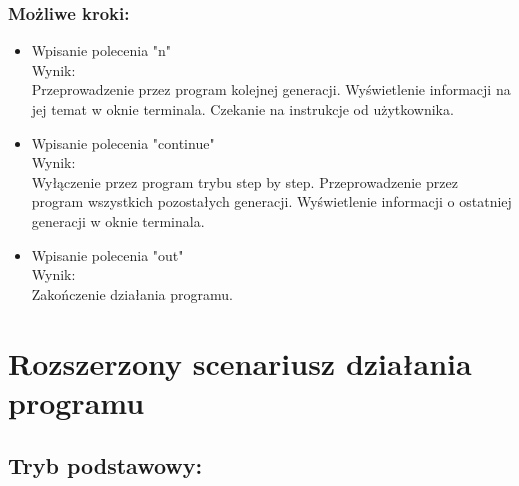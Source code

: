 \documentclass[11pt,a4paper]{report}
\begin{document}
\subsubsection {Możliwe kroki:}
\begin {itemize}
\item Wpisanie polecenia "n"\\
		Wynik:\\
		Przeprowadzenie przez program kolejnej generacji. Wyświetlenie informacji na jej temat w oknie terminala. Czekanie na instrukcje od użytkownika.
\item Wpisanie polecenia "continue"\\
		Wynik:\\
		Wyłączenie przez program trybu step by step. Przeprowadzenie przez program wszystkich pozostałych generacji.
		Wyświetlenie informacji o ostatniej generacji w oknie terminala.
\item Wpisanie polecenia "out"\\
		Wynik:\\
		Zakończenie działania programu.\\
\end{itemize}

\section {Rozszerzony scenariusz działania programu}\label{sec:teskt}
\subsection[Tryb podstawowy] {Tryb podstawowy:}
\end{document}
